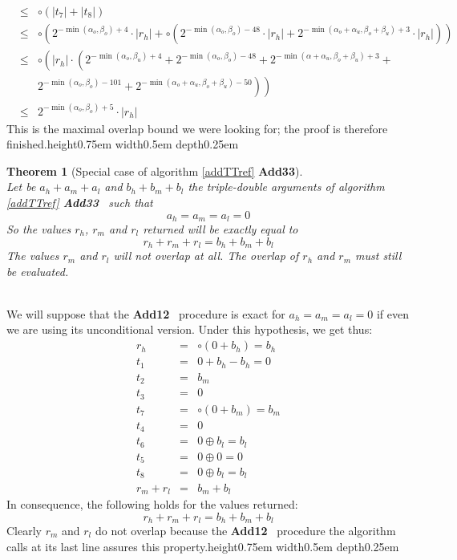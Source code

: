 \documentclass[a4paper,10pt,twoside]{article}
\newtheorem{theorem}{Theorem}[section]
\newenvironment{proof}[1][Proof]{\begin{trivlist}
\item[\hskip \labelsep {\bfseries #1}]}{\end{trivlist}}
\newcommand{\qed}{\nobreak \ifvmode \relax \else \ifdim \lastskip<1.5em \hskip-\lastskip
\hskip1.5em plus0em minus0.5em \fi \nobreak \vrule height0.75em width0.5em depth0.25em\fi}
\newcommand{\hi}{\ensuremath{\mathit{h}}}
\newcommand{\mi}{\ensuremath{\mathit{m}}}
\newcommand{\lo}{\ensuremath{\mathit{l}}}
\newcommand{\Add}{{\bf Add12}}
\newcommand{\AddTT}{{\bf Add33}}
\begin{document}
\begin{proof}
\begin{eqnarray*}
& \leq & \circ \left( \left \vert t_7 \right \vert + \left \vert t_8 \right \vert \right) \\
& \leq & \circ \left( 2^{-\min\left(\alpha_o,\beta_o\right)+4} \cdot \left \vert r_\hi \right \vert +
\circ \left( 2^{-\min\left(\alpha_o,\beta_o\right)-48} \cdot \left \vert r_\hi \right \vert +
2^{-\min\left(\alpha_o+\alpha_u,\beta_o+\beta_u\right)+3} \cdot \left \vert r_\hi \right \vert \right) \right) \\
& \leq & \circ \left( \left \vert r_\hi \right \vert \cdot \left( 2^{-\min\left(\alpha_o,\beta_u\right)+4} +
2^{-\min\left(\alpha_o,\beta_o\right)-48} + 2^{-\min\left(\alpha+\alpha_u,\beta_o+\beta_u\right)+3} + \right. \right. \\
& & \left. \left. 2^{-\min\left(\alpha_o,\beta_o\right) -101} + 2^{-\min\left(\alpha_o+\alpha_u,\beta_o+\beta_u\right)-50} \right) \right) \\
& \leq & 2^{-\min\left(\alpha_o,\beta_o\right)+5} \cdot \left \vert r_\hi \right \vert
\end{eqnarray*}
This is the maximal overlap bound we were looking for; the proof is therefore finished.\qed
\end{proof}
\begin{theorem}[Special case of algorithm \ref{addTTref} \AddTT] ~ \\
Let be $a_\hi + a_\mi + a_\lo$ and $b_\hi + b_\mi + b_\lo$ the triple-double
arguments of algorithm \ref{addTTref} \AddTT~ such that
$$a_\hi = a_\mi = a_\lo = 0$$
So the values $r_\hi$, $r_\mi$ and $r_\lo$ returned will be exactly equal to
$$r_\hi + r_\mi + r_\lo = b_\hi + b_\mi + b_\lo$$
The values $r_\mi$ and $r_\lo$ will not overlap at all. The overlap of $r_\hi$
and $r_\mi$ must still be evaluated.
\end{theorem}
\begin{proof} ~\\
We will suppose that the \Add~ procedure is exact for $a_\hi=a_\mi=a_\lo=0$ if even we are using its unconditional
version. Under this hypothesis, we get thus:
\begin{eqnarray*}
r_\hi & = & \circ \left( 0 + b_\hi \right) = b_\hi \\
t_1 & = & 0 + b_\hi - b_\hi = 0 \\
t_2 & = & b_\mi \\
t_3 & = & 0 \\
t_7 & = & \circ \left( 0 + b_\mi \right) = b_\mi \\
t_4 & = & 0 \\
t_6 & = & 0 \oplus b_\lo = b_\lo \\
t_5 & = & 0 \oplus 0 = 0 \\
t_8 & = & 0 \oplus b_\lo = b_\lo \\
r_\mi + r_\lo & = & b_\mi + b_\lo
\end{eqnarray*}
In consequence, the following holds for the values returned:
$$r_\hi + r_\mi + r_\lo = b_\hi + b_\mi + b_\lo$$
Clearly $r_\mi$ and $r_\lo$ do not overlap because the \Add~ procedure the algorithm calls at its last line assures this
property.\qed
\end{proof}
\end{document}
